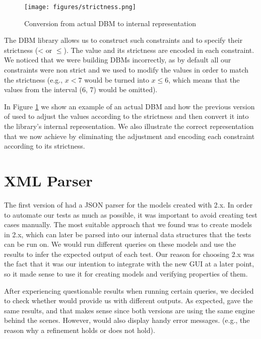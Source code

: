 \begin{figure}
  \centering
  \texttt{[image: figures/strictness.png]}
  \caption{Conversion from actual DBM to internal representation}
  \label{fig:strictness}
\end{figure}

The DBM library allows us to construct such constraints and to specify their strictness (< or $\leq$). The value and its strictness are encoded in each constraint. We noticed that we were building DBMs incorrectly, as by default all our constraints were non strict and we used to modify the values in order to match the strictness (e.g., $x < 7$ would be turned into $x \leq 6$, which means that the values from the interval (6, 7) would be omitted).

In Figure \ref{fig:strictness} we show an example of an actual DBM and how the previous version of \jecdar used to adjust the values according to the strictness and then convert it into the library's internal representation. We also illustrate the correct representation that we now achieve by eliminating the adjustment and encoding each constraint according to its strictness.

\section{XML Parser}

The first version of \jecdar had a JSON parser for the models created with \ecdar 2.x. In order to automate our tests as much as possible, it was important to avoid creating test cases manually. The most suitable approach that we found was to create models in \ecdar 2.x, which can later be parsed into our internal data structures that the tests can be run on. We would run different queries on these models and use the results to infer the expected output of each test. Our reason for choosing \ecdar 2.x was the fact that it was our intention to integrate \jecdar with the new GUI at a later point, so it made sense to use it for creating models and verifying properties of them.

After experiencing questionable results when running certain queries, we decided to check whether  would provide us with different outputs. As expected,  gave the same results, and that makes sense since both versions are using the same engine behind the scenes. However,  would also display handy error messages. (e.g., the reason why a refinement holds or does not hold).

